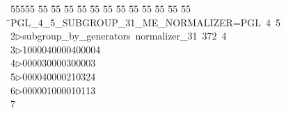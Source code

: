 %
%
\begin{tabbing}
55555 \= 55 \= 55 \= 55 \= 55 \= 55 \= 55 \= 55 \= 55 \= 55 \= 55 \= 55 \= 55 \= \>PGL\_4\_5\_SUBGROUP\_31\_ME\_NORMALIZER=PGL\ 4\ 5\ \\[0pt]
2\>$\triangleright$\>subgroup\_by\_generators\ normalizer\_31\ 372\ 4\ \\[0pt]
3\>$\triangleright$\>1000040000400004\ \\[0pt]
4\>$\triangleright$000030000300003\ \\[0pt]
5\>$\triangleright$000040000210324\ \\[0pt]
6\>$\triangleright$000001000010113\ \\[0pt]
7\>\end{tabbing}
